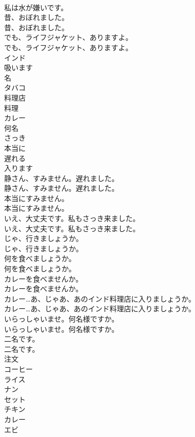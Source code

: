 \documentclass[8pt]{extreport}
\begin{document}
\begin{CJK}{UTF8}{min}
\\	私は水が嫌いです。 
\\	昔、おぼれました。	
\\	昔、おぼれました。 
\\	でも、ライフジャケット、ありますよ。	
\\	でも、ライフジャケット、ありますよ。 
\\	インド
\\	吸います
\\	名
\\	タバコ
\\	料理店
\\	料理
\\	カレー
\\	何名
\\	さっき
\\	本当に
\\	遅れる
\\	入ります
\\	静さん、すみません。遅れました。	
\\	静さん、すみません。遅れました。 
\\	本当にすみません。	
\\	本当にすみません。 
\\	いえ、大丈夫です。私もさっき来ました。	
\\	いえ、大丈夫です。私もさっき来ました。 
\\	じゃ、行きましょうか。	
\\	じゃ、行きましょうか。 
\\	何を食べましょうか。	
\\	何を食べましょうか。 
\\	カレーを食べませんか。	
\\	カレーを食べませんか。 
\\	カレー…あ、じゃあ、あのインド料理店に入りましょうか。	
\\	カレー…あ、じゃあ、あのインド料理店に入りましょうか。 
\\	いらっしゃいませ。何名様ですか。	
\\	いらっしゃいませ。何名様ですか。 
\\	二名です。	
\\	二名です。 
\\	注文
\\	コーヒー
\\	ライス
\\	ナン
\\	セット
\\	チキン
\\	カレー
\\	エビ

\end{CJK}
\end{document}
